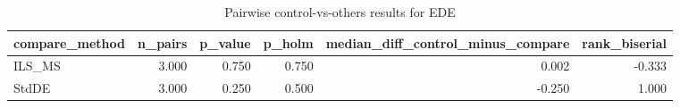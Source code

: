 \begin{table}[!t]
\centering
\caption{Pairwise control-vs-others results for EDE}
\label{tab:posthoc_holm_generated}
\begin{tabular}{lrrrrr}
\toprule
compare_method & n_pairs & p_value & p_holm & median_diff_control_minus_compare & rank_biserial \\
\midrule
ILS_MS & 3.000 & 0.750 & 0.750 & 0.002 & -0.333 \\
StdDE & 3.000 & 0.250 & 0.500 & -0.250 & 1.000 \\
\bottomrule
\end{tabular}

\end{table}